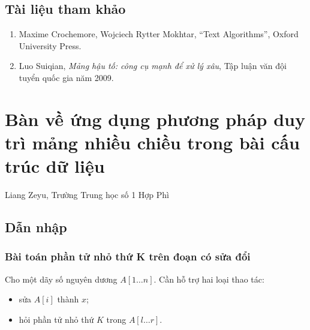 \documentclass[11pt]{article}
\begin{document}
\subsection*{Tài liệu tham khảo}

\begin{enumerate}
  \item Maxime Crochemore, Wojciech Rytter Mokhtar, ``Text Algorithms'',
  Oxford University Press.
  \item Luo Suiqian, \emph{Mảng hậu tố: công cụ mạnh để xử lý xâu}, Tập luận
  văn đội tuyển quốc gia năm 2009.
\end{enumerate}

\section{Bàn về ứng dụng phương pháp duy trì mảng nhiều chiều trong bài cấu trúc dữ liệu}

\begin{center}
Liang Zeyu, Trường Trung học số 1 Hợp Phì
\end{center}

\begin{abstract}
Trong vài năm gần đây, mảng cấu trúc dữ liệu trong thi tin học phát triển rất
nhanh, xuất hiện nhiều phương pháp và tư tưởng mới mẻ, hữu dụng để giải bài
cấu trúc dữ liệu, như tư tưởng chia khối, cấu trúc dữ liệu lồng nhau, cấu trúc
dữ liệu bền vững và có thể hoàn tác, chia để trị theo thời gian, nhị phân toàn
cục, phương pháp đánh nhãn, v.v. Tuy nhiên các phương pháp ấy đôi khi cũng có
nhược điểm: lượng mã lớn, dễ viết sai, hằng số lớn. Bài viết này nêu một cách
giải bài cấu trúc dữ liệu dựa trên việc duy trì mảng nhiều chiều, giới thiệu
nguyên lý cơ bản, ứng dụng và so sánh của phương pháp này với các phương pháp
khác, đồng thời đưa ra một số ví dụ.
\end{abstract}

\subsection{Dẫn nhập}

\subsubsection{Bài toán phần tử nhỏ thứ K trên đoạn có sửa đổi}

Cho một dãy số nguyên dương \(A[1\ldots n]\). Cần hỗ trợ hai loại thao tác:
\begin{itemize}
  \item sửa \(A[i]\) thành \(x\);
  \item hỏi phần tử nhỏ thứ \(K\) trong \(A[l\ldots r]\).
\end{itemize}
\end{document}
